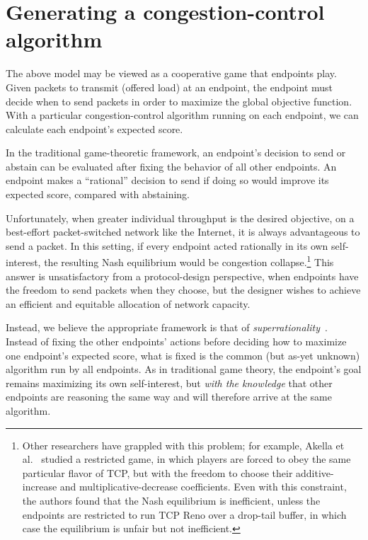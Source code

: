 \section{Generating a congestion-control algorithm}
\label{s:design}

The above model may be viewed as a cooperative game that endpoints play. Given
packets to transmit (offered load) at an endpoint, the endpoint must
decide when to send packets in order to maximize the global objective
function. With a particular congestion-control algorithm running on
each endpoint, we can calculate each endpoint's expected score.

In the traditional game-theoretic framework, an endpoint's decision to
send or abstain can be evaluated after fixing the behavior of all
other endpoints. An endpoint makes a ``rational'' decision to send if
doing so would improve its expected score, compared with abstaining.

Unfortunately, when greater individual throughput is the desired
objective, on a best-effort packet-switched network like the Internet,
it is always advantageous to send a packet. In this setting, if every
endpoint acted rationally in its own self-interest, the resulting Nash
equilibrium would be congestion collapse.\footnote{Other researchers
  have grappled with this problem; for example, Akella et
  al.~\cite{Akella02} studied a restricted game, in which players are
  forced to obey the same particular flavor of TCP, but with the freedom
  to choose their additive-increase and multiplicative-decrease
  coefficients. Even with this constraint, the authors found that the Nash
  equilibrium is inefficient, unless the endpoints are restricted to
  run TCP Reno over a drop-tail buffer, in which case the equilibrium
  is unfair but not inefficient.}  This answer is unsatisfactory from
a protocol-design perspective, when endpoints have the freedom to send
packets when they choose, but the designer wishes to achieve an
efficient and equitable allocation of network capacity.

Instead, we believe the appropriate framework is that of {\em
  superrationality}~\cite{hofstadter1985metamagical}. Instead of
fixing the other endpoints' actions before deciding how to maximize
one endpoint's expected score, what is fixed is the common (but as-yet
unknown) algorithm run by all endpoints. As in traditional game
theory, the endpoint's goal remains maximizing its own self-interest,
but {\em with the knowledge} that other endpoints are reasoning the
same way and will therefore arrive at the same algorithm.

